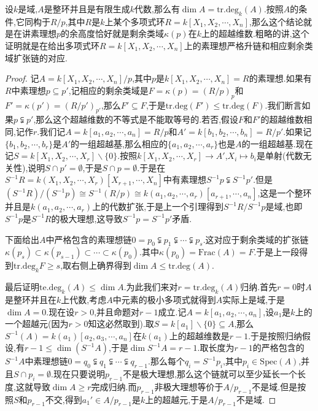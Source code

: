 设$k$是域,$A$是整环并且是有限生成$k$代数,那么有$\dim A=\mathrm{tr.deg}_k(A)$.按照$A$的条件,它同构于$R/p$,其中$R$是$k$上某个多项式环$R=k[X_1,X_2,\cdots,X_n]$,那么这个结论就是在讲素理想$p$的余高度恰好就是剩余类域$\kappa(p)$在$k$上的超越维数.粗略的讲,这个证明就是在给出多项式环$R=k[X_1,X_2,\cdots,X_n]$上的素理想严格升链和相应剩余类域扩张链的对应.
\begin{proof}
	
	记$A=k[X_1,X_2,\cdots,X_n]/p$,其中$p$是$k[X_1,X_2,\cdots,X_n]=R$的素理想.如果有$R$中素理想$p\subseteq p'$,记相应的剩余类域是$F=\kappa(p)=(R/p)_p$和$F'=\kappa(p')=(R/p')_{p'}$,那么$F'\subseteq F$,于是$\mathrm{tr.deg}(F')\le\mathrm{tr.deg}(F)$.我们断言如果$p\subsetneqq p'$,那么这个超越维数的不等式是不能取等号的.若否,假设$F$和$F'$的超越维数相同,记作$r$.我们记$A=k[a_1,a_2,\cdots,a_n]=R/p$和$A'=k[b_1,b_2,\cdots,b_n]=R/p'$.如果记$\{b_1,b_2,\cdots,b_r\}$是$A'$的一组超越基,那么相应的$\{a_1,a_2,\cdots,a_r\}$也是$A$的一组超越基.现在记$S=k[X_1,X_2,\cdots,X_r]\backslash\{0\}$.按照$k[X_1,X_2,\cdots,X_r]\to A'$,$X_i\mapsto b_i$是单射(代数无关性),说明$S\cap p'=\emptyset$,于是$S\cap p=\emptyset$.于是在$S^{-1}R=k(X_1,X_2,\cdots,X_r)[X_{r+1},\cdots,X_n]$中有素理想$S^{-1}p\subsetneqq S^{-1}p'$.但是$(S^{-1}R)/(S^{-1}p)\cong S^{-1}(R/p)\cong k(a_1,a_2,\cdots,a_r)[a_{r+1},\cdots,a_n]$,这是一个整环并且是$k(a_1,a_2,\cdots,a_r)$上的代数扩张,于是上一个引理得到$S^{-1}R/S^{-1}p$是域,也即$S^{-1}p$是$S^{-1}R$的极大理想,这导致$S^{-1}p=S^{-1}p'$矛盾.
	
	下面给出$A$中严格包含的素理想链$0=p_0\subsetneqq p_1\subsetneqq\cdots\subsetneqq p_s$.这对应于剩余类域的扩张链$\kappa(p_s)\subset\kappa(p_{s-1})\subset\cdots\subset\kappa(p_0)$.其中$\kappa(p_0)=\mathrm{Frac}(A)=F$.于是上一段得到$\mathrm{tr.deg}_kF\ge s$,取右侧上确界得到$\dim A\le\mathrm{tr.deg}(A)$.
	
	最后证明$\mathrm{te.deg}_k(A)\le\dim A$.为此我们来对$r=\mathrm{tr.deg}_k(A)$归纳.首先$r=0$时$A$是整环并且在$k$上代数,考虑$A$中元素的极小多项式就得到$A$实际上是域,于是$\dim A=0$.现在设$r>0$,并且命题对$r-1$成立.记$A=k[a_1,a_2,\cdots,a_n]$,设$a_1$是$k$上的一个超越元(因为$r>0$知这必然取到).取$S=k[a_1]\backslash\{0\}\subseteq A$,那么$S^{-1}(A)=k(a_1)[a_2,a_3,\cdots,a_n]$在$k(a_1)$上的超越维数是$r-1$.于是按照归纳假设,有$r-1\le\dim(S^{-1}A)$,于是$\dim S^{-1}A=r-1$.取长度为$r-1$的严格包含的$S^{-1}A$中素理想链$0=q_0\subsetneqq q_1\subsetneqq\cdots\subsetneqq q_{r-1}$.那么每个$q_i=S^{-1}p_i$,其中$p_i\in\mathrm{Spec}(A)$,并且$S\cap p_i=\emptyset$.现在只要说明$p_{r-1}$不是极大理想,那么这个链就可以至少延长一个长度,这就导致$\dim A\ge r$完成归纳.而$p_{r-1}$非极大理想等价于$A/p_{r-1}$不是域.但是按照$S$和$p_{r-1}$不交,得到$a_1'\in A/p_{r-1}$是$k$上的超越元,于是$A/p_{r-1}$不是域.
\end{proof}

